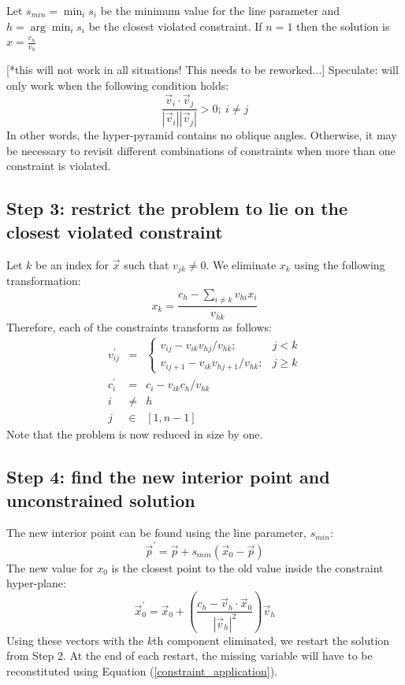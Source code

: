\documentclass{article}
\begin{document}
Let $s_{min}=\min_i s_i$ be the minimum value for the line parameter and 
$h=\arg \min_i s_i$ be the closest violated constraint.
If $n=1$ then the solution is $x=\frac{c_h}{v_h}$

[*this will not work in all situations! This needs to be reworked...]
Speculate: will only work when the following condition holds:
\begin{equation}
	\frac{\vec v_i \cdot \vec v_j}{|\vec v_i||\vec v_j|} > 0;~i \ne j
\end{equation}
In other words, the hyper-pyramid contains no oblique angles.
Otherwise, it may be necessary to revisit different combinations of constraints
when more than one constraint is violated.

\subsection{Step 3: restrict the problem to lie on the closest violated constraint}

Let $k$ be an index for $\vec x$ such that $v_{jk} \ne 0$. 
We eliminate $x_k$ using the following transformation:
\begin{equation}
	x_k = \frac{c_h - \sum_{i \ne k} v_{hi} x_i}{v_{hk}}
	\label{constraint_application}
\end{equation}
Therefore, each of the constraints transform as follows:
\begin{eqnarray}
	v_{ij}^\prime & = & \left \lbrace \begin{array}{rc} 
	v_{ij} - {v_{ik} v_{hj}}/{v_{hk}} ; & j < k \\
	v_{ij+1} - {v_{ik} v_{hj+1}}/{v_{hk}} ; & j \ge k
	\end{array} \right . \\
	c_i^\prime & = & c_i - {v_{ik} c_h}/{v_{hk}} \\
	i & \ne & h \\
	j & \in & [1, n-1]
\end{eqnarray}
Note that the problem is now reduced in size by one.

\subsection{Step 4: find the new interior point and unconstrained solution}

The new interior point can be found using the line parameter, $s_{min}$:
\begin{equation}
	\vec p^\prime = \vec p + s_{min} (\vec x_0 - \vec p)
\end{equation}
The new value for $x_0$ is the closest point to the old value inside the
constraint hyper-plane:
\begin{equation}
	\vec x_0^\prime = \vec x_0 + \left ( \frac{c_h - \vec v_h \cdot \vec x_0}{| \vec v_h |^2} \right ) \vec v_h
\end{equation}
Using these vectors with the $k$th component eliminated, we restart the
solution from Step 2.
At the end of each restart, the missing variable will have to be reconstituted
using Equation (\ref{constraint_application}).

 
\end{document}

